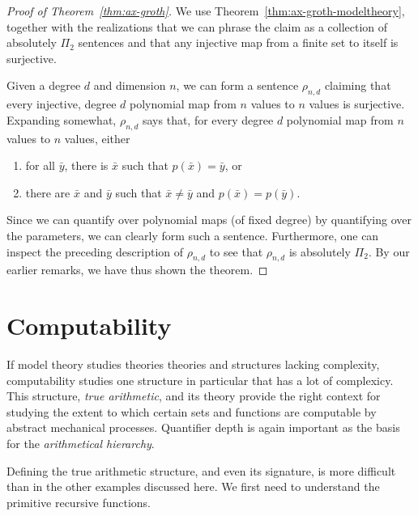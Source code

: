 \documentclass{article}
\theoremstyle{plain}
\theoremstyle{definition}
\newcommand{\defterm}{\emph}
\newcommand{\tuple}{\bar}
\begin{document}
\begin{proof}[Proof of Theorem~\ref{thm:ax-groth}]
  We use Theorem~\ref{thm:ax-groth-modeltheory}, together with the
  realizations that we can phrase the claim as a collection of
  absolutely $\Pi_2$ sentences and that any injective map from a
  finite set to itself is surjective.

  Given a degree $d$ and dimension $n$, we can form a sentence
  $\rho_{n,d}$ claiming that every injective, degree $d$ polynomial
  map from $n$ values to $n$ values is surjective. Expanding somewhat,
  $\rho_{n,d}$ says that, for every degree $d$ polynomial map from $n$
  values to $n$ values, either
  \begin{enumerate}
  \item for all $\tuple{y}$, there is $\tuple{x}$ such that $p(\tuple{x}) = \tuple{y}$, or
  \item there are $\tuple{x}$ and $\tuple{y}$ such that $\tuple{x}
    \neq \tuple{y}$ and $p(\tuple{x}) = p(\tuple{y})$.
  \end{enumerate}
  Since we can quantify over polynomial maps (of fixed degree) by
  quantifying over the parameters, we can clearly form such a
  sentence. Furthermore, one can inspect the preceding description of
  $\rho_{n,d}$ to see that $\rho_{n,d}$ is absolutely $\Pi_2$. By our
  earlier remarks, we have thus shown the theorem.
\end{proof}

\section{Computability}

If model theory studies theories theories and structures lacking
complexity, computability studies one structure in particular that has
a lot of complexicy. This structure, \defterm{true arithmetic}, and
its theory provide the right context for studying the extent to which
certain sets and functions are computable by abstract mechanical
processes. Quantifier depth is again important as the basis for the
\defterm{arithmetical hierarchy}.

Defining the true arithmetic structure, and even its signature, is
more difficult than in the other examples discussed here. We first
need to understand the primitive recursive functions.
\end{document}
